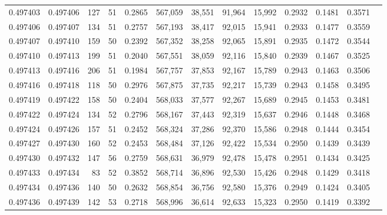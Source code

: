 \begin{tabular}{rrrrrrrrrrrrr}
0.497403 & 0.497406 &   127 &  51 &                                     0.2865 & 567,059 &  38,551 &  91,964 &  15,992 & 0.2932 & 0.1481 & 0.3571 \\
0.497406 & 0.497407 &   134 &  51 &                                     0.2757 & 567,193 &  38,417 &  92,015 &  15,941 & 0.2933 & 0.1477 & 0.3559 \\
0.497407 & 0.497410 &   159 &  50 &                                     0.2392 & 567,352 &  38,258 &  92,065 &  15,891 & 0.2935 & 0.1472 & 0.3544 \\
0.497410 & 0.497413 &   199 &  51 &                                     0.2040 & 567,551 &  38,059 &  92,116 &  15,840 & 0.2939 & 0.1467 & 0.3525 \\
0.497413 & 0.497416 &   206 &  51 &                                     0.1984 & 567,757 &  37,853 &  92,167 &  15,789 & 0.2943 & 0.1463 & 0.3506 \\
0.497416 & 0.497418 &   118 &  50 &                                     0.2976 & 567,875 &  37,735 &  92,217 &  15,739 & 0.2943 & 0.1458 & 0.3495 \\
0.497419 & 0.497422 &   158 &  50 &                                     0.2404 & 568,033 &  37,577 &  92,267 &  15,689 & 0.2945 & 0.1453 & 0.3481 \\
0.497422 & 0.497424 &   134 &  52 &                                     0.2796 & 568,167 &  37,443 &  92,319 &  15,637 & 0.2946 & 0.1448 & 0.3468 \\
0.497424 & 0.497426 &   157 &  51 &                                     0.2452 & 568,324 &  37,286 &  92,370 &  15,586 & 0.2948 & 0.1444 & 0.3454 \\
0.497427 & 0.497430 &   160 &  52 &                                     0.2453 & 568,484 &  37,126 &  92,422 &  15,534 & 0.2950 & 0.1439 & 0.3439 \\
0.497430 & 0.497432 &   147 &  56 &                                     0.2759 & 568,631 &  36,979 &  92,478 &  15,478 & 0.2951 & 0.1434 & 0.3425 \\
0.497433 & 0.497434 &    83 &  52 &                                     0.3852 & 568,714 &  36,896 &  92,530 &  15,426 & 0.2948 & 0.1429 & 0.3418 \\
0.497434 & 0.497436 &   140 &  50 &                                     0.2632 & 568,854 &  36,756 &  92,580 &  15,376 & 0.2949 & 0.1424 & 0.3405 \\
0.497436 & 0.497439 &   142 &  53 &                                     0.2718 & 568,996 &  36,614 &  92,633 &  15,323 & 0.2950 & 0.1419 & 0.3392 \\

\end{tabular}
